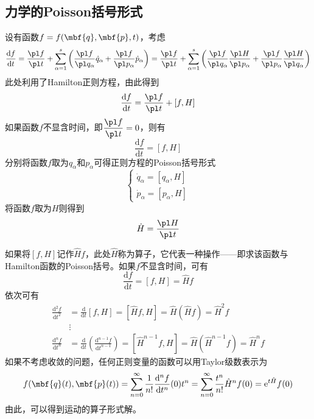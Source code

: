 \subsection{力学的Poisson括号形式}

设有函数$f = f(\mbf{q},\mbf{p},t)$，考虑
\begin{equation*}
	\frac{\mathrm{d} f}{\mathrm{d} t} = \frac{\pl f}{\pl t} + \sum_{\alpha=1}^s \left(\frac{\pl f}{\pl q_\alpha} \dot{q}_\alpha + \frac{\pl f}{\pl p_\alpha} \dot{p}_\alpha\right) = \frac{\pl f}{\pl t} + \sum_{\alpha=1}^s \left(\frac{\pl f}{\pl q_\alpha} \frac{\pl H}{\pl p_\alpha} + \frac{\pl f}{\pl p_\alpha} \frac{\pl H}{\pl q_\alpha}\right)
\end{equation*}
此处利用了Hamilton正则方程，由此得到
\begin{equation}
	\frac{\mathrm{d} f}{\mathrm{d} t} = \frac{\pl f}{\pl t} + [f,H]
\end{equation}
如果函数$f$不显含时间，即$\dfrac{\pl f}{\pl t} = 0$，则有
\begin{equation}
	\frac{\mathrm{d} f}{\mathrm{d} t} = [f,H]
\end{equation}
分别将函数$f$取为$q_\alpha$和$p_\alpha$可得{\heiti 正则方程的Poisson括号形式}
\begin{equation}
	\begin{cases}
		\displaystyle \dot{q}_\alpha = [q_\alpha,H] \\[1.5ex]
		\displaystyle \dot{p}_\alpha = [p_\alpha,H]
	\end{cases}
\end{equation}
将函数$f$取为$H$则得到
\begin{equation}
	\dot{H} = \frac{\pl H}{\pl t}
\end{equation}

如果将$[f,H]$记作$\hat{H} f$，此处$\hat{H}$称为{\heiti 算子}，它代表一种操作——即求该函数与Hamilton函数的Poisson括号。如果$f$不显含时间，可有
\begin{equation*}
	\frac{\mathrm{d} f}{\mathrm{d} t} = [f,H] = \hat{H}f
\end{equation*}
依次可有
\begin{align*}
	\frac{\mathrm{d}^2 f}{\mathrm{d} t^2} & = \frac{\mathrm{d}}{\mathrm{d} t}[f,H] = [\hat{H}f,H] = \hat{H} (\hat{H} f) = \hat{H}^2 f \\
	& \vdots \\
	\frac{\mathrm{d}^n f}{\mathrm{d} t^n} & = \frac{\mathrm{d}}{\mathrm{d} t}\left(\frac{\mathrm{d}^{n-1}f}{\mathrm{d} t^{n-1}}\right) = [\hat{H}^{n-1}f,H] = \hat{H} (\hat{H}^{n-1} f) = \hat{H}^n f
\end{align*}
如果不考虑收敛的问题，任何正则变量的函数可以用Taylor级数表示为
\begin{align*}
	f(\mbf{q}(t),\mbf{p}(t)) = \sum_{n=0}^\infty \frac{1}{n!} \frac{\mathrm{d}^n f}{\mathrm{d} t^n}(0) t^n = \sum_{n=0}^\infty \frac{t^n}{n!} \hat{H}^n f(0) = \mathrm{e}^{t\hat{H}} f(0)
\end{align*}
由此，可以得到运动的算子形式解。

